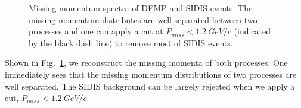 \begin{figure}[!ht]
 \begin{center}
   \caption[Missing Momentum]{\footnotesize{Missing momentum spectra of DEMP
and SIDIS events. The missing momentum distributes are well separated between
two processes and one can apply a cut at $P_{miss}<1.2~GeV/c$ (indicated by the
black dash line) to remove most of SIDIS events.}}
  \label{missing_mom}
  \end{center}
\end{figure}

Shown in Fig.~\ref{missing_mom}, we reconstruct the missing momenta of both
processes. One immediately sees that the missing momentum distributions of two
processes are well separated. The SIDIS background can be largely rejected when
we apply a cut, $P_{miss}<1.2~GeV/c$.

